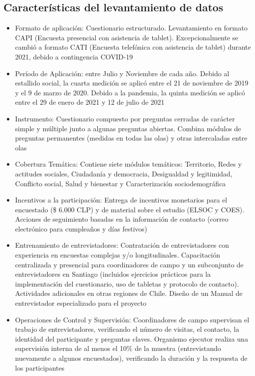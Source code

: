 \documentclass[
  12pt,
]{book}
\begin{document}
\hypertarget{caracteruxedsticas-del-levantamiento-de-datos}{%
\subsection*{Características del levantamiento de datos}\label{caracteruxedsticas-del-levantamiento-de-datos}}

\begin{itemize}
\item
  Formato de aplicación: Cuestionario estructurado. Levantamiento en formato CAPI (Encuesta presencial con asistencia de tablet). Excepcionalmente se cambió a formato CATI (Encuesta telefónica con asistencia de tablet) durante 2021, debido a contingencia COVID-19
\item
  Período de Aplicación: entre Julio y Noviembre de cada año. Debido al estallido social, la cuarta medición se aplicó entre el 21 de noviembre de 2019 y el 9 de marzo de 2020. Debido a la pandemia, la quinta medición se aplicó entre el 29 de enero de 2021 y 12 de julio de 2021
\item
  Instrumento: Cuestionario compuesto por preguntas cerradas de carácter simple y múltiple junto a algunas preguntas abiertas. Combina módulos de preguntas permanentes (medidas en todas las olas) y otras intercaladas entre olas
\item
  Cobertura Temática: Contiene siete módulos temáticos: Territorio, Redes y actitudes sociales, Ciudadanía y democracia, Desigualdad y legitimidad, Conflicto social, Salud y bienestar y Caracterización sociodemográfica
\item
  Incentivos a la participación: Entrega de incentivos monetarios para el encuestado (\$ 6.000 CLP) y de material sobre el estudio (ELSOC y COES). Acciones de seguimiento basadas en la información de contacto (correo electrónico para cumpleaños y días festivos)
\item
  Entrenamiento de entrevistadores: Contratación de entrevistadores con experiencia en encuestas complejas y/o longitudinales. Capacitación centralizada y presencial para coordinadores de campo y un subconjunto de entrevistadores en Santiago (incluidos ejercicios prácticos para la implementación del cuestionario, uso de tabletas y protocolo de contacto). Actividades adicionales en otras regiones de Chile. Diseño de un Manual de entrevistador especializado para el proyecto
\item
  Operaciones de Control y Supervisión: Coordinadores de campo supervisan el trabajo de entrevistadores, verificando el número de visitas, el contacto, la identidad del participante y preguntas claves. Organismo ejecutor realiza una supervisión interna de al menos el 10\% de la muestra (entrevistando nuevamente a algunos encuestados), verificando la duración y la respuesta de los participantes
\end{itemize}
\end{document}
